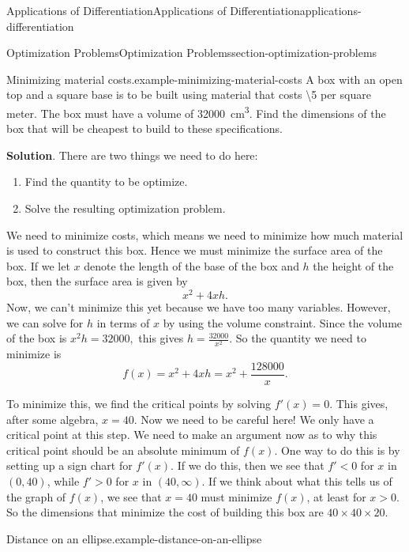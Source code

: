 \documentclass[oneside,10pt,]{book}
\numberwithin{equation}{section}
\begin{document}
\begin{chapterptx}{Applications of Differentiation}{}{Applications of Differentiation}{}{}{applications-differentiation}
\begin{sectionptx}{Optimization Problems}{}{Optimization Problems}{}{}{section-optimization-problems}
\begin{example}{Minimizing material costs.}{example-minimizing-material-costs}
\hypertarget{p-358}{}%
A box with an open top and a square base is to be built using material that costs \textbackslash{}\textdollar{}5 per square meter. The box must have a volume of \SI{32000}{\centi\meter\tothe{3}}. Find the dimensions of the box that will be cheapest to build to these specifications.%
\par\smallskip%
\noindent\textbf{Solution}.\hypertarget{solution-79}{}\quad%
\hypertarget{p-359}{}%
There are two things we need to do here:\leavevmode%
\begin{enumerate}
\item\hypertarget{li-24}{}Find the quantity to be optimize.%
\item\hypertarget{li-25}{}Solve the resulting optimization problem.%
\end{enumerate}
We need to minimize costs, which means we need to minimize how much material is used to construct this box. Hence we must minimize the surface area of the box. If we let \(x\) denote the length of the base of the box and \(h\) the height of the box, then the surface area is given by%
\begin{equation*}
x^{2} + 4xh.
\end{equation*}
Now, we can't minimize this yet because we have too many variables. However, we can solve for \(h\) in terms of \(x\) by using the volume constraint. Since the volume of the box is \(x^{2}h = 32000,\) this gives \(h = \frac{32000}{x^{2}}.\) So the quantity we need to minimize is%
\begin{equation*}
f(x) = x^{2} + 4xh = x^{2} + \frac{128000}{x}.
\end{equation*}
%
\par
\hypertarget{p-360}{}%
To minimize this, we find the critical points by solving \(f'(x) = 0\). This gives, after some algebra, \(x = 40\). Now we need to be careful here! We only have a critical point at this step. We need to make an argument now as to why this critical point should be an absolute minimum of \(f(x)\). One way to do this is by setting up a sign chart for \(f'(x)\). If we do this, then we see that \(f' < 0\) for \(x\) in \((0,40)\), while \(f' > 0\) for \(x\) in \((40,\infty)\). If we think about what this tells us of the graph of \(f(x)\), we see that \(x=40\) must minimize \(f(x)\), at least for \(x > 0\). So the dimensions that minimize the cost of building this box are \(40\times40\times20\).%
\end{example}
\begin{example}{Distance on an ellipse.}{example-distance-on-an-ellipse}%

\end{example}
\end{sectionptx}
\end{chapterptx}
\end{document}
